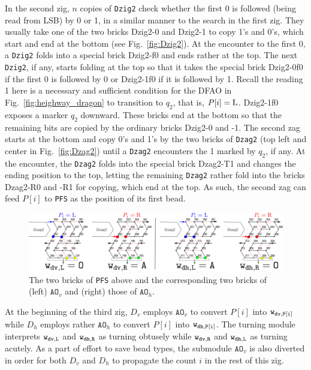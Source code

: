 \documentclass[dvipdfmx,review]{elsarticle}
\begin{document}
In the second zig, $n$ copies of \texttt{Dzig2} check whether the first 0 is followed (being read from LSB) by 0 or 1, in a similar manner to the search in the first zig. 
They usually take one of the two bricks Dzig2-0 and Dzig2-1 to copy 1's and 0's, which start and end at the bottom (see Fig.~\ref{fig:Dzig2}).
At the encounter to the first 0, a \texttt{Dzig2} folds into a special brick Dzig2-f0 and ends rather at the top. 
The next \texttt{Dzig2}, if any, starts folding at the top so that it takes the special brick Dzig2-0f0 if the first 0 is followed by 0 or Dzig2-1f0 if it is followed by 1. 
Recall the reading 1 here is a necessary and sufficient condition for the DFAO in Fig.~\ref{fig:heighway_dragon} to transition to $q_2$, that is, $P[i] = {\rm L}$. 
Dzig2-1f0 exposes a marker $q_2$ downward. 
These bricks end at the bottom so that the remaining bits are copied by the ordinary bricks Dzig2-0 and -1. 
The second zag starts at the bottom and copy 0's and 1's by the two bricks of \texttt{Dzag2} (top left and center in Fig.~\ref{fig:Dzag2}) until a \texttt{Dzag2} encounters the 1 marked by $q_2$, if any. 
At the encounter, the \texttt{Dzag2} folds into the special brick Dzag2-T1 and changes the ending position to the top, letting the remaining \texttt{Dzag2} rather fold into the bricks Dzag2-R0 and -R1 for copying, which end at the top. 
As such, the second zag can feed $P[i]$ to \texttt{PFS} as the position of its first bead. 

\begin{figure}[tb]
\centering
\includegraphics[width=\linewidth]{Figs/PFS.png}
\caption{The two bricks of \texttt{PFS} above and the corresponding two bricks of (left) $\mathtt{AO}_v$ and (right) those of $\mathtt{AO}_h$.}
\label{fig:PFS}
\end{figure}


At the beginning of the third zig, $D_v$ employs $\mathtt{AO}_v$ to convert $P[i]$ into ${\tt w_{dv, P[i]}}$ while $D_h$ employs rather $\mathtt{AO}_h$ to convert $P[i]$ into ${\tt w_{dh, P[i]}}$. 
The turning module interprets ${\tt w_{dv, L}}$ and ${\tt w_{dh, R}}$ as turning obtusely while ${\tt w_{dv, R}}$ and ${\tt w_{dh, L}}$ as turning acutely. 
As a part of effort to save bead types, the submodule $\mathtt{AO}_v$ is also diverted in order for both $D_v$ and $D_h$ to propagate the count $i$ in the rest of this zig. 
\end{document}
